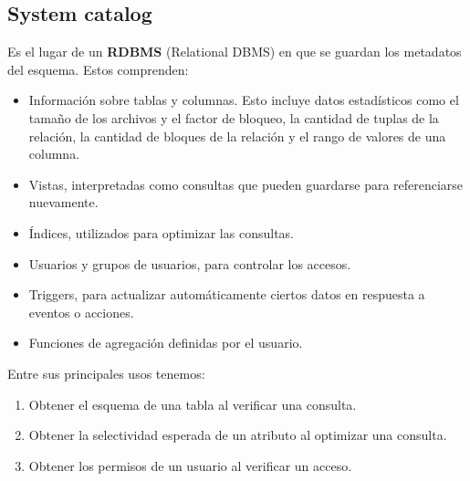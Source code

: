 \subsection*{System catalog}
Es el lugar de un \textbf{RDBMS} (Relational DBMS) en que se guardan los metadatos del esquema. Estos comprenden:
\begin{itemize}
    \item Información sobre tablas y columnas. Esto incluye datos estadísticos como el tamaño de los archivos y el factor de bloqueo, la cantidad de tuplas de la relación, la cantidad de bloques de la relación y el rango de valores de una columna.
    \item Vistas, interpretadas como consultas que pueden guardarse para referenciarse nuevamente.
    \item Índices, utilizados para optimizar las consultas.
    \item Usuarios y grupos de usuarios, para controlar los accesos.
    \item Triggers, para actualizar automáticamente ciertos datos en respuesta a eventos o acciones.
    \item Funciones de agregación definidas por el usuario.
\end{itemize}
Entre sus principales usos tenemos:
\begin{enumerate}[label=\roman*]
    \item Obtener el esquema de una tabla al verificar una consulta.
    \item Obtener la selectividad esperada de un atributo al optimizar una consulta.
    \item Obtener los permisos de un usuario al verificar un acceso.
\end{enumerate}

